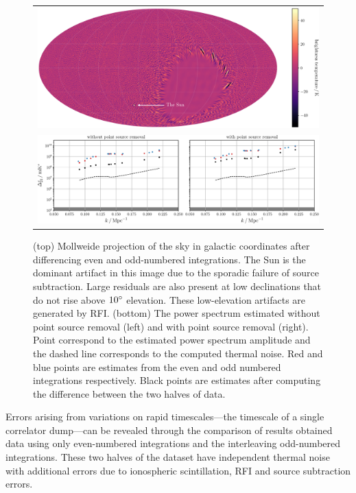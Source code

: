 \begin{bibunit}
\begin{figure}
    \centering
    \begin{tabular}{c}
        \includegraphics[width=\textwidth]{figures/chapter4/even-odd-sky-map-colorbar}\\
        \includegraphics[width=\textwidth]{figures/chapter4/spherical-power-spectrum-even-odd}\\
    \end{tabular}
    \caption{
        (top) Mollweide projection of the sky in galactic coordinates after differencing even and
        odd-numbered integrations. The Sun is the dominant artifact in this image due to the
        sporadic failure of source subtraction. Large residuals are also present at low declinations
        that do not rise above $10\mbox{$^\circ$}$ elevation. These low-elevation artifacts are generated by
        RFI.
        (bottom) The power spectrum estimated without point source removal (left) and with point
        source removal (right). Point correspond to the estimated power spectrum amplitude and the
        dashed line corresponds to the computed thermal noise. Red and blue points are estimates
        from the even and odd numbered integrations respectively. Black points are estimates after
        computing the difference between the two halves of data.
    }
    \label{fig:spherical-power-spectra-even-odd}
\end{figure}

Errors arising from variations on rapid timescales---the timescale of a single correlator dump---can
be revealed through the comparison of results obtained data using only even-numbered integrations
and the interleaving odd-numbered integrations. These two halves of the dataset have independent
thermal noise with additional errors due to ionospheric scintillation, RFI and source subtraction
errors.


\end{bibunit}
